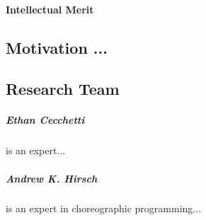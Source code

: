 \paragraph{Intellectual Merit}


\subsection{Motivation ...}
\label{sec:motivation}


\subsection{Research Team}

\subparagraph{Ethan Cecchetti} is an expert...

\subparagraph{Andrew K. Hirsch} is an expert in choreographic programming...

